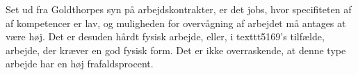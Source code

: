 Set ud fra Goldthorpes syn på arbejdskontrakter, er det jobs, hvor specifiteten af af kompetencer er lav, og muligheden for overvågning af arbejdet må antages at være høj. Det er desuden hårdt fysisk arbejde, eller, i  texttt{5169}'s tilfælde, arbejde, der kræver en god fysisk form. Det er ikke overraskende, at denne type arbejde har en høj frafaldsprocent. %



\section{ \label{}}


























%







